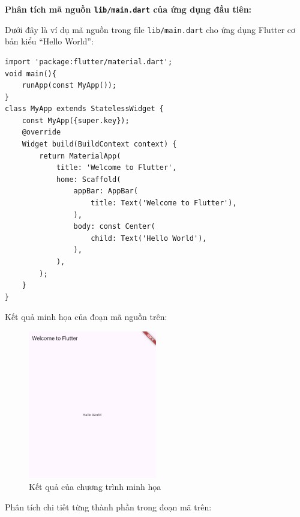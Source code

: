 \documentclass[../DoAn.tex]{subfiles}
\numberwithin{figure}{chapter}
\begin{document}
\textbf{Phân tích mã nguồn \texttt{lib/main.dart} của ứng dụng đầu tiên:}

Dưới đây là ví dụ mã nguồn trong file \texttt{lib/main.dart} cho ứng dụng Flutter cơ bản kiểu “Hello World”:

\begin{lstlisting}
import 'package:flutter/material.dart'; 
void main(){
    runApp(const MyApp());
}
class MyApp extends StatelessWidget { 
    const MyApp({super.key});
    @override 
    Widget build(BuildContext context) { 
        return MaterialApp( 
            title: 'Welcome to Flutter', 
            home: Scaffold( 
                appBar: AppBar( 
                    title: Text('Welcome to Flutter'), 
                ), 
                body: const Center( 
                    child: Text('Hello World'), 
                ), 
            ), 
        ); 
    }
}
\end{lstlisting}

Kết quả minh họa của đoạn mã nguồn trên:
\begin{figure}[H]
    \centering
    \includegraphics[width=0.5\textwidth]{Hinhve/Chuong5/demofirstprogram.png}
    \caption{Kết quả của chương trình minh họa}
    \label{fig:flutterstructure}
\end{figure}

Phân tích chi tiết từng thành phần trong đoạn mã trên:
\end{document}
